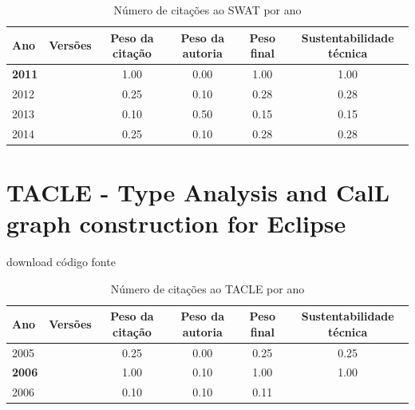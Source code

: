 \begin{table}[H]
\caption{Número de citações ao SWAT  por ano}
\centering
\begin{tabular}{| l | c | c | c | c | c |}
  \hline
  Ano & Versões & Peso da citação & Peso da autoria & Peso final & Sustentabilidade técnica \\
  \hline
            {\bf 2011}
          &
          
          &
          1.00
          &
          0.00
          &
          1.00
          &
            {\color{blue} 1.00}
          \\
\hline
            2012
          &
          
          &
          0.25
          &
          0.10
          &
          0.28
          &
            {\color{red} 0.28}
          \\
\hline
            2013
          &
          
          &
          0.10
          &
          0.50
          &
          0.15
          &
            {\color{red} 0.15}
          \\
\hline
            2014
          &
          
          &
          0.25
          &
          0.10
          &
          0.28
          &
            {\color{red} 0.28}
          \\
\hline
\end{tabular}
\end{table}



\section{TACLE - Type Analysis and CalL graph construction for Eclipse}
\checkmark download
\checkmark código fonte


\begin{table}[H]
\caption{Número de citações ao TACLE  por ano}
\centering
\begin{tabular}{| l | c | c | c | c | c |}
  \hline
  Ano & Versões & Peso da citação & Peso da autoria & Peso final & Sustentabilidade técnica \\
  \hline
            2005
          &
          
          &
          0.25
          &
          0.00
          &
          0.25
          &
            {\color{red} 0.25}
          \\
\hline
            {\bf 2006}
          &
          
          &
          1.00
          &
          0.10
          &
          1.00
          &
            {\color{blue} 1.00}
          \\
            2006
          &
          
          &
          0.10
          &
          0.10
          &
          0.11
          &
          \\
\hline
\end{tabular}
\end{table}



